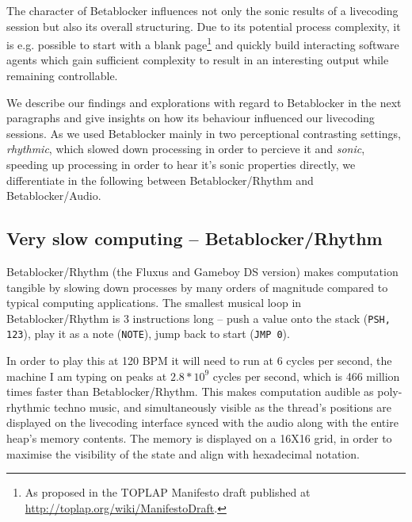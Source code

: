 \documentclass[letterpaper, 12pt]{article}
\begin{document}
The character of Betablocker influences not only the sonic results of a livecoding session but also its overall structuring.
Due to its potential process complexity, it is e.g. possible to start with a blank page\footnote{As proposed in the TOPLAP Manifesto draft published at \url{http://toplap.org/wiki/ManifestoDraft}.}
and quickly build interacting software agents which gain sufficient complexity to result in an interesting output while remaining controllable.

We describe our findings and explorations with regard to Betablocker in the next paragraphs and give insights on how its behaviour influenced our livecoding sessions.
As we used Betablocker mainly in two perceptional contrasting settings, \emph{rhythmic}, which slowed down processing in order to percieve it and \emph{sonic}, speeding up processing in order to hear it's sonic properties directly, we differentiate in the following between Betablocker/Rhythm and Betablocker/Audio.

\parskip 18pt

\subsection{Very slow computing -- Betablocker/Rhythm}
\label{sub:slow_computing}

Betablocker/Rhythm (the Fluxus and Gameboy DS version) makes computation tangible by slowing down processes by many orders of magnitude compared to typical computing applications. 
The smallest musical loop in Betablocker/Rhythm is 3 instructions long -- push a value onto the stack (\texttt{PSH, 123}), play it as a note (\texttt{NOTE}), jump back to start (\texttt{JMP 0}). 

In order to play this at 120 BPM it will need to run at 6 cycles per second, the machine I am typing on peaks at $2.8*10^9$ cycles per second, which is 466 million times faster than Betablocker/Rhythm. 
This makes computation audible as poly-rhythmic techno music, and simultaneously visible as the thread's positions are displayed on the livecoding interface synced with the audio along with the entire heap's memory contents. The memory is displayed on a 16X16 grid, in order to maximise the visibility of the state and align with hexadecimal notation.
\end{document}
